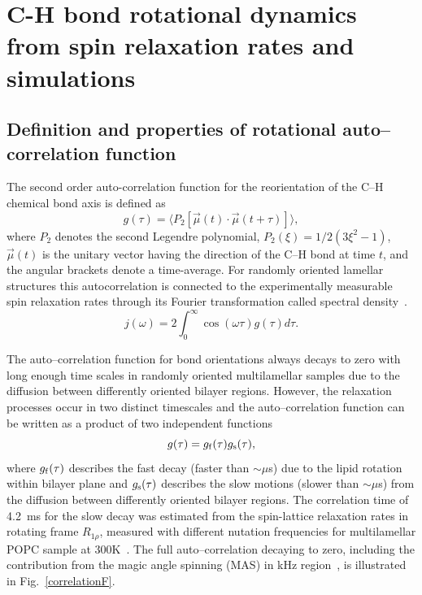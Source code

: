 \documentclass[aps,prl,superscriptaddress,twocolumn]{revtex4}
\begin{document}
\section{C-H bond rotational dynamics from spin relaxation rates and simulations}\label{dynamicsSECTION}

\subsection{Definition and properties of rotational auto--correlation function}
The second order auto-correlation function for the reorientation of the C--H chemical bond axis is defined as
\begin{equation}\label{gt}
g(\tau) = \langle P_2[\vec{\mu}(t)\cdot\vec{\mu}(t+\tau)]\rangle,
\end{equation} 
where $P_2$ denotes the second Legendre polynomial, $P_2(\xi) = 1/2 (3\xi^2 - 1)$, $\vec{\mu}(t)$ is the unitary vector having the 
direction of the C--H bond at time $t$, and the angular brackets denote a time-average. 
For randomly oriented lamellar structures this autocorrelation is connected to the experimentally 
measurable spin relaxation rates through its Fourier transformation called spectral density~\cite{Lipari82}.
\begin{equation}\label{FT}
j(\omega) =  2\int_0^{\infty} \cos(\omega \tau) g(\tau) d\tau.
\end{equation}

The auto--correlation function for bond orientations always decays to zero
with long enough time scales in randomly oriented multilamellar samples due to the
diffusion between differently oriented bilayer regions. 
However, the relaxation processes occur in two distinct timescales and the auto--correlation function
can be written as a product of two independent functions~\cite{halle81,ferreira15}
\begin{equation}\label{corrF}
g(\tau)=g_{\rm{f}}(\tau) g_{\rm{s}}(\tau),
\end{equation}
where $g_{\rm{f}}(\tau)$ describes the fast decay (faster than $\sim \mu$s) due  
to the lipid rotation within bilayer plane and $g_{\rm{s}}(\tau)$ describes the slow motions (slower than $\sim \mu$s)
from the diffusion between differently oriented bilayer regions.
The correlation time of 4.2~ms for the slow decay was estimated from the spin-lattice relaxation rates in 
rotating frame $R_{1\rho}$, measured with different nutation frequencies for multilamellar POPC sample at 300K~\cite{ferreira15}.
The full auto--correlation decaying to zero, including the contribution from the magic angle spinning (MAS) in kHz region~\cite{nowacka10},
is illustrated in Fig.~\ref{correlationF}. 
\end{document}
